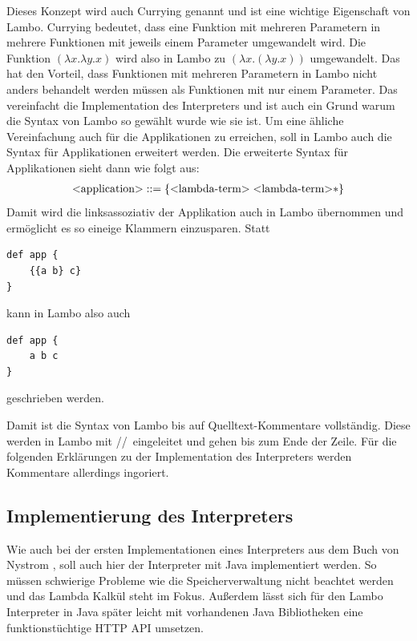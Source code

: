 \documentclass[ngerman]{article}
\begin{document}
Dieses Konzept wird auch Currying genannt und ist eine wichtige Eigenschaft von Lambo. Currying bedeutet, dass eine Funktion mit mehreren Parametern in mehrere Funktionen mit jeweils einem Parameter umgewandelt wird. Die Funktion $(\lambda x.\lambda y.x)$ wird also in Lambo zu $(\lambda x.(\lambda y.x))$ umgewandelt. Das hat den Vorteil, dass Funktionen mit mehreren Parametern in Lambo nicht anders behandelt werden müssen als Funktionen mit nur einem Parameter. Das vereinfacht die Implementation des Interpreters und ist auch ein Grund warum die Syntax von Lambo so gewählt wurde wie sie ist. Um eine ähliche Vereinfachung auch für die Applikationen zu erreichen, soll in Lambo auch die Syntax für Applikationen erweitert werden. Die erweiterte Syntax für Applikationen sieht dann wie folgt aus:
\begin{align*}
    \text{\textless application\textgreater} & ::= \{\text{\textless lambda-term\textgreater} \; \text{\textless lambda-term\textgreater}*\} \\
\end{align*}
Damit wird die linksassoziativ der Applikation auch in Lambo übernommen und ermöglicht es so eineige Klammern einzusparen. Statt
\begin{lstlisting}
def app {
    {{a b} c}
}
\end{lstlisting}
kann in Lambo also auch
\begin{lstlisting}
def app {
    a b c
}
\end{lstlisting}
geschrieben werden. 

Damit ist die Syntax von Lambo bis auf Quelltext-Kommentare vollständig. Diese werden in Lambo mit \slash\slash\ eingeleitet und gehen bis zum Ende der Zeile. Für die folgenden Erklärungen zu der Implementation des Interpreters werden Kommentare allerdings ingoriert.

\subsection{Implementierung des Interpreters}

\captionsetup{labelformat=empty}
\lstset{
    language=Java,
    frame=single,
    breaklines=true,
    numbers=left,
    stepnumber=1,
    showstringspaces=false,
    tabsize=1,
    breaklines=true,
    breakatwhitespace=false,
    xleftmargin=.1\textwidth,
    xrightmargin=.1\textwidth
}

Wie auch bei der ersten Implementationen eines Interpreters aus dem Buch von Nystrom \cite[Kap. 4-13]{nystrom}, soll auch hier der Interpreter mit Java implementiert werden. So müssen schwierige Probleme wie die Speicherverwaltung nicht beachtet werden und das Lambda Kalkül steht im Fokus. Außerdem lässt sich für den Lambo Interpreter in Java später leicht mit vorhandenen Java Bibliotheken eine funktionstüchtige HTTP API umsetzen.
\end{document}

